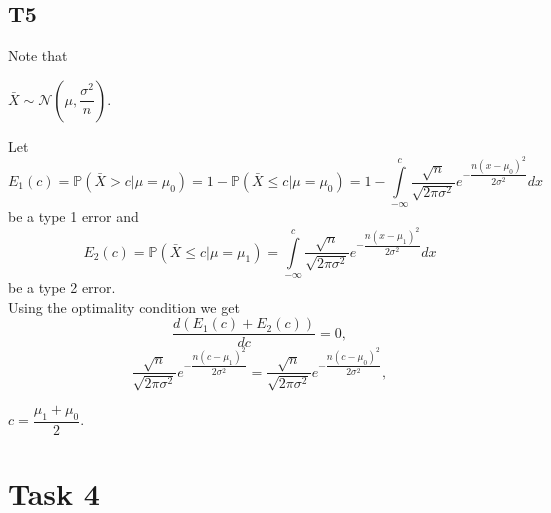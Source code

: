 \documentclass[a4paper, 12pt]{article}
\renewcommand*{\P}{\mathbb{P}}
\begin{document}
\subsection*{T5}
Note that 
\begin{tcolorbox}
[enhanced,width=\textwidth,center upper,
 fontupper=\large\bfseries,
 drop fuzzy shadow southeast,
 colframe=red!50!black,colback=yellow!25]
$\bar{X} \sim \mathcal{N} \left( \mu, \dfrac{\sigma^2}{n} \right).$
\end{tcolorbox}
Let 
$$
E_1(c) = \P(\bar{X} > c | \mu = \mu_0) = 1- \P(\bar{X} \leqslant c | \mu = \mu_0) = 1- \int \limits_{-\infty}^{c} \dfrac{\sqrt{n}}{\sqrt{2 \pi \sigma^2}} e^{-\dfrac{n (x-\mu_0)^2}{2 \sigma^2}} dx
$$
be a type 1 error and 
$$
E_2(c) = \P(\bar{X} \leqslant c | \mu = \mu_1) = \int \limits_{-\infty}^{c} \dfrac{\sqrt{n}}{\sqrt{2 \pi \sigma^2}} e^{-\dfrac{n (x-\mu_1)^2}{2 \sigma^2}} dx
$$
be a type 2 error.\\
Using the optimality condition we get
$$
\dfrac{d (E_1(c) + E_2(c))}{dc} = 0,
$$ 
$$
 \dfrac{\sqrt{n}}{\sqrt{2 \pi \sigma^2}} e^{-\dfrac{n (c-\mu_1)^2}{2 \sigma^2}} =  \dfrac{\sqrt{n}}{\sqrt{2 \pi \sigma^2}} e^{-\dfrac{n (c-\mu_0)^2}{2 \sigma^2}},
$$
\begin{tcolorbox}
[enhanced,width=\textwidth,center upper,
 fontupper=\large\bfseries,
 drop fuzzy shadow southeast,
 colframe=red!50!black,colback=yellow!25]
$
c = \dfrac{\mu_1 + \mu_0}{2}.
$
\end{tcolorbox}

\section*{Task 4}
\end{document}
